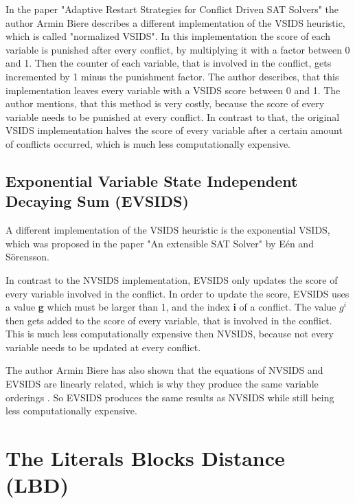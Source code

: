 In the paper "Adaptive Restart Strategies for Conflict Driven SAT Solvers" \cite{biere2008adaptive} the author Armin Biere describes a different implementation of the VSIDS heuristic, which is called "normalized VSIDS". In this implementation the score of each variable is punished after every conflict, by multiplying it with a factor between 0 and 1. Then the counter of each variable, that is involved in the conflict, gets incremented by 1 minus the punishment factor. The author describes, that this implementation leaves every variable with a VSIDS score between 0 and 1. The author mentions, that this method is very costly, because the score of every variable needs to be punished at every conflict. In contrast to that, the original VSIDS implementation halves the score of every variable after a certain amount of conflicts occurred, which is much less computationally expensive.

\subsection{Exponential Variable State Independent Decaying Sum (EVSIDS)}

A different implementation of the VSIDS heuristic is the exponential VSIDS, which was proposed in the paper "An extensible SAT Solver" \cite{een2003extensible} by E{\'e}n and S{\"o}rensson. 

In contrast to the NVSIDS implementation, EVSIDS only updates the score of every variable involved in the conflict. In order to update the score, EVSIDS uses a value \textbf{g} which must be larger than 1, and the index \textbf{i} of a conflict. The value $g^{i}$ then gets added to the score of every variable, that is involved in the conflict. This is much less computationally expensive then NVSIDS, because not every variable needs to be updated at every conflict. \cite{biere2008adaptive}

The author Armin Biere has also shown that the equations of NVSIDS and EVSIDS are linearly related, which is why they produce the same variable orderings \cite{biere2008adaptive}. So EVSIDS produces the same results as NVSIDS while still being less computationally expensive.

\section{The Literals Blocks Distance (LBD)}

